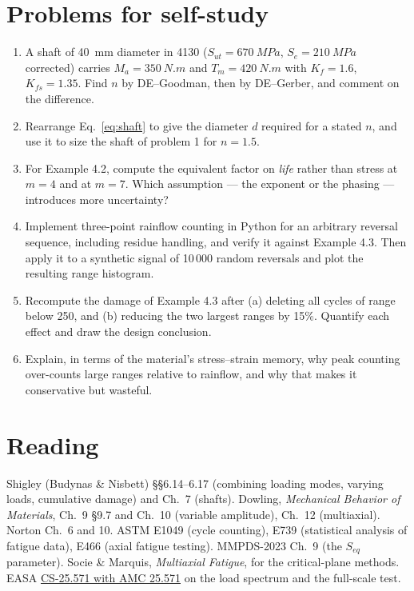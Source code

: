 \documentclass[11pt,a4paper]{article}
\begin{document}
\section{Problems for self-study}
\begin{enumerate}[nosep]
  \item A shaft of \SI{40}{mm} diameter in 4130 ($S_{ut}=\SI{670}{MPa}$, $S_e=\SI{210}{MPa}$ corrected) carries $M_a=\SI{350}{N.m}$ and $T_m=\SI{420}{N.m}$ with $K_f=1.6$, $K_{fs}=1.35$. Find $n$ by DE--Goodman, then by DE--Gerber, and comment on the difference.
  \item Rearrange Eq.~\eqref{eq:shaft} to give the diameter $d$ required for a stated $n$, and use it to size the shaft of problem 1 for $n=1.5$.
  \item For Example 4.2, compute the equivalent factor on \emph{life} rather than stress at $m=4$ and at $m=7$. Which assumption --- the exponent or the phasing --- introduces more uncertainty?
  \item Implement three-point rainflow counting in Python for an arbitrary reversal sequence, including residue handling, and verify it against Example 4.3. Then apply it to a synthetic signal of 10\,000 random reversals and plot the resulting range histogram.
  \item Recompute the damage of Example 4.3 after (a) deleting all cycles of range below 250, and (b) reducing the two largest ranges by 15\%. Quantify each effect and draw the design conclusion.
  \item Explain, in terms of the material's stress--strain memory, why peak counting over-counts large ranges relative to rainflow, and why that makes it conservative but wasteful.
\end{enumerate}

\section*{Reading}
Shigley (Budynas \& Nisbett) \S\S6.14--6.17 (combining loading modes, varying loads, cumulative damage) and Ch.\ 7 (shafts). Dowling, \emph{Mechanical Behavior of Materials}, Ch.\ 9 \S9.7 and Ch.\ 10 (variable amplitude), Ch.\ 12 (multiaxial). Norton Ch.\ 6 and 10. ASTM E1049 (cycle counting), E739 (statistical analysis of fatigue data), E466 (axial fatigue testing). MMPDS-2023 Ch.\ 9 (the $S_{eq}$ parameter). Socie \& Marquis, \emph{Multiaxial Fatigue}, for the critical-plane methods. EASA \href{https://www.easa.europa.eu/en/document-library/easy-access-rules/online-publications/easy-access-rules-large-aeroplanes-cs-25}{CS-25.571 with AMC 25.571} on the load spectrum and the full-scale test.
\end{document}
